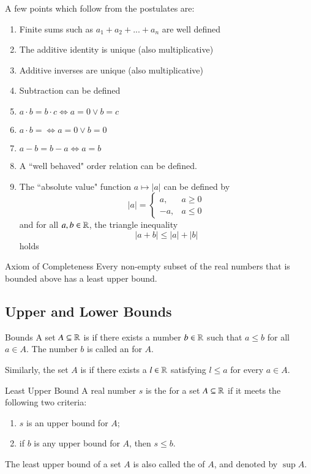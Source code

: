 \documentclass[12pt]{report}
\begin{document}
\begin{rmk}{}{}
    A few points which follow from the postulates are:\begin{enumerate}
        \item Finite sums such as $a_1+a_2+...+a_n$ are well defined
        \item The additive identity is unique (also multiplicative)
        \item Additive inverses are unique (also multiplicative)
        \item Subtraction can be defined 
        \item $a \cdot b = b \cdot c \iff a = 0\lor b = c$
        \item $a\cdot b = \iff a = 0 \lor b = 0$
        \item $a-b = b-a \iff a = b$
        \item A ``well behaved" order relation can be defined.
        \item The ``absolute value" function $a \mapsto |a|$ can be defined by $$|a| = \left\{\begin{array}{ll} a, & a \geq 0 \\ -a, & a \leq 0 \end{array}\right.$$ and for all $a,b \in \mathbb R$, the triangle inequality $$|a+b| \leq |a| + |b|$$ holds
    \end{enumerate}
\end{rmk}


\begin{axi*}{Axiom of Completeness}{}
    Every non-empty subset of the real numbers that is bounded above has a least upper bound.
\end{axi*}

\subsection{Upper and Lower Bounds}

\begin{defn}{Bounds}{}
    A set $A \subseteq \mathbb R$ is  if there exists a number $b \in \mathbb R$ such that $a \leq b$ for all $a \in A$. The number $b$ is called an  for $A$.


    Similarly, the set $A$ is  if there exists a  $l \in \mathbb R$ satisfying $l \leq a$ for every $a \in A$.
\end{defn}

\begin{defn}{Least Upper Bound}{}
    A real number $s$ is the  for a set $A \subseteq \mathbb R$ if it meets the following two criteria: \begin{enumerate}
        \item $s$ is an upper bound for $A$;
        \item if $b$ is any upper bound for $A$, then $s \leq b$.
    \end{enumerate}
    The least upper bound of a set $A$ is also called the  of $A$, and denoted by $\sup A$.
\end{defn}
\end{document}

